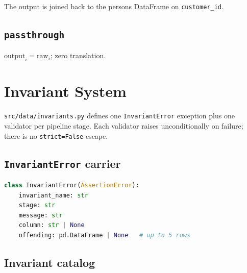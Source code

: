\documentclass[11pt,a4paper]{article}
\begin{document}
The output is joined back to the persons DataFrame on \texttt{customer\_id}.

\subsection{\texttt{passthrough}}

$\text{output}_i = \text{raw}_i$; zero translation.

\section{Invariant System}
\label{sec:invariants}

\texttt{src/data/invariants.py} defines one \texttt{InvariantError}
exception plus one validator per pipeline stage. Each validator raises
unconditionally on failure; there is no \texttt{strict=False} escape.

\subsection{\texttt{InvariantError} carrier}

\begin{lstlisting}[language=Python]
class InvariantError(AssertionError):
    invariant_name: str
    stage: str
    message: str
    column: str | None
    offending: pd.DataFrame | None   # up to 5 rows
\end{lstlisting}

\subsection{Invariant catalog}
\end{document}
